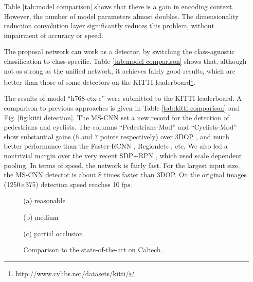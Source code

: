 \documentclass[runningheads]{llncs}
\begin{document}
Table \ref{tab:model comparison} shows that there is a gain in encoding
context. However, the number of model parameters almost doubles. The
dimensionality reduction convolution layer significantly reduces
this problem, without impairment of accuracy or speed.

The proposal network can work as a detector, by switching the class-agnostic classification to class-specific. Table \ref{tab:model comparison}
shows that, although not as strong as the unified network, it achieves fairly good results, which are better than those of some detectors on the KITTI leaderboard\footnote{http://www.cvlibs.net/datasets/kitti/}.


The results of model ``h768-ctx-c'' were submitted to the KITTI leaderboard. A comparison
to previous approaches is given in Table \ref{tab:kitti comparison} and
Fig. \ref{fig:kitti detection}. The MS-CNN set a new record
for the detection of pedestrians and cyclists. The columns ``Pedestrians-Mod'' and ``Cyclists-Mod''
show substantial gains (6 and 7 points respectively) over
3DOP \cite{DBLP:conf/nips/XiaozhiNIPS15}, and much better performance
than the Faster-RCNN \cite{DBLP:conf/nips/shaoqing15fasterRcnn},
Regionlets \cite{DBLP:conf/iccv/WangYZL13}, etc. We also led a nontrivial margin over the very recent SDP+RPN \cite{DBLP:conf/cvpr/yang2016sdp}, which used scale dependent pooling. In terms of speed, the network is fairly fast. For the largest input size, the MS-CNN detector is about 8 times faster than 3DOP. On the original images
(1250$\times$375) detection speed reaches 10 fps.

\begin{figure*}[!t]
\begin{minipage}[b]{.32\linewidth}
\centering
\centerline{}{(a) reasonable}
\end{minipage}
\hfill
\begin{minipage}[b]{.32\linewidth}
\centering
\centerline{}{(b) medium}
\end{minipage}
\hfill
\begin{minipage}[b]{.32\linewidth}
\centering
\centerline{}{(c) partial occlusion}
\end{minipage}
\caption{Comparison to the state-of-the-art on Caltech.}
\label{fig:caltech}
\end{figure*}
\end{document}
